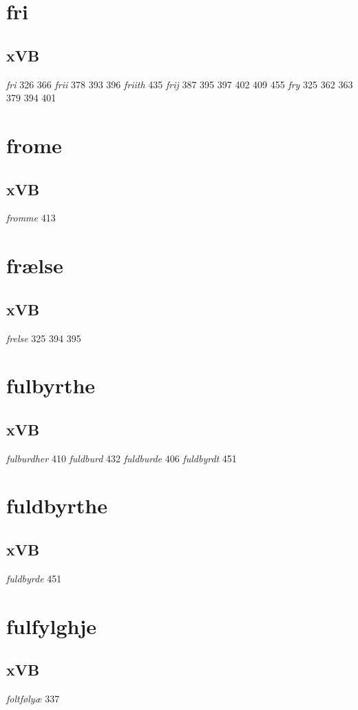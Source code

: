 \documentclass[a4paper,twocolumn]{article}
\begin{document}
\section{fri}
\label{sec:org0ea7eb6}
\subsection{xVB}
\label{sec:org8163ed5}
\emph{fri} 326 366 \emph{frii} 378 393 396 \emph{friith} 435 \emph{frij} 387 395 397 402 409 455 \emph{fry} 325 362 363 379 394 401 
\section{frome}
\label{sec:org4beccb8}
\subsection{xVB}
\label{sec:org5ee713b}
\emph{fromme} 413 
\section{frælse}
\label{sec:orga0c6d02}
\subsection{xVB}
\label{sec:orgb3f0ed5}
\emph{frelse} 325 394 395 
\section{fulbyrthe}
\label{sec:orgcd1aa90}
\subsection{xVB}
\label{sec:orge7e7f2e}
\emph{fulburdher} 410 \emph{fuldburd} 432 \emph{fuldburde} 406 \emph{fuldbyrdt} 451 
\section{fuldbyrthe}
\label{sec:orgdceeb21}
\subsection{xVB}
\label{sec:org5d4743b}
\emph{fuldbyrde} 451 
\section{fulfylghje}
\label{sec:org7832cf0}
\subsection{xVB}
\label{sec:orgafed194}
\emph{foltfølyæ} 337 
\end{document}
